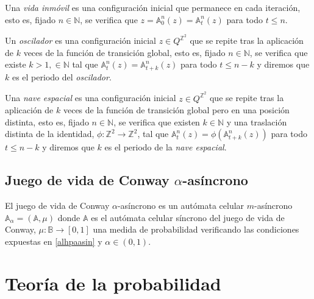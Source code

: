 \documentclass[../proyecto.tex]{memoir}
\begin{document}


\begin{defi}
Una \textit{vida inmóvil} es una configuración inicial que permanece en cada iteración, esto es, fijado $n\in\mathds{N}$, se verifica que $z = \mathds{A}^n_0(z) = \mathds{A}^n_t(z)$ para todo $t \leq n$.
\end{defi}

\begin{defi}
Un \textit{oscilador} es una configuración inicial $z\in Q^{\mathds{Z}^{2}}$ que se repite tras la aplicación de $k$ veces de la función de transición global, esto es, fijado $n\in\mathds{N}$, se verifica que existe $k>1, \in\mathds{N}$ tal que $\mathds{A}^n_t(z) = \mathds{A}^n_{t+k}(z)$ para todo $t \leq n-k$ y diremos que $k$ es el periodo del \textit{oscilador}.
\end{defi}

\begin{defi}
Una \textit{nave espacial} es una configuración inicial $z\in Q^{\mathds{Z}^{2}}$ que se repite tras la aplicación de $k$ veces de la función de transición global pero en una posición distinta, esto es, fijado $n\in\mathds{N}$, se verifica que existen $k\in\mathds{N}$ y una traslación distinta de la identidad, $\phi:\mathds{Z}^2\to\mathds{Z}^2$, tal que $\mathds{A}^n_t(z) = \phi(\mathds{A}^n_{t+k}(z))$ para todo $t \leq n-k$ y diremos que $k$ es el periodo de la \textit{nave espacial}.
\end{defi}

\subsection{Juego de vida de Conway $\alpha$-asíncrono}
\begin{defi}
El juego de vida de Conway $\alpha$-asíncrono es un autómata celular $m$-asíncrono $\mathds{A}_\alpha=(\mathds{A}, \mu)$ donde $\mathds{A}$ es el autómata celular síncrono del juego de vida de Conway, $\mu: \mathds{B} \rightarrow [0,1]$ una medida de probabilidad verificando las condiciones expuestas en \ref{alhpaasin} y $\alpha \in (0,1)$. 
\end{defi}


\section{Teoría de la probabilidad}
\end{document}
